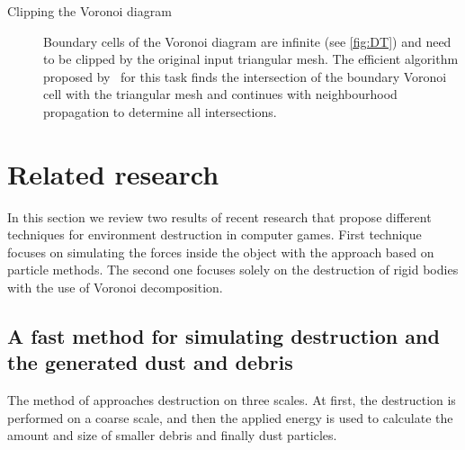 \begin{description}
    \item[Clipping the Voronoi diagram] Boundary cells of the Voronoi diagram are infinite (see \cref{fig:DT}) and need to be clipped by the original input triangular mesh. The efficient algorithm proposed by~\citet{yan2010efficient} for this task finds the intersection of the boundary Voronoi cell with the triangular mesh and continues with neighbourhood propagation to determine all intersections. 
\end{description}



\section{Related research}
In this section we review two results of recent research that propose different techniques for environment destruction in computer games. First technique focuses on simulating the forces inside the object with the approach based on particle methods. The second one focuses solely on the destruction of rigid bodies with the use of Voronoi decomposition.

\subsection{A fast method for simulating destruction and the generated dust
and debris}
\label{sec:edem}
The method of \citet{edem} approaches destruction on three scales. At first, the destruction is performed on a coarse scale, and then the applied energy is used to calculate the amount and size of smaller debris and finally dust particles.

